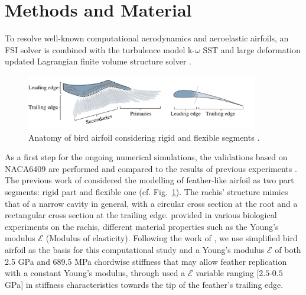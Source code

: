 \documentclass[conf]{new-aiaa}
\begin{document}
\section{Methods and Material}
To resolve well-known computational aerodynamics and aeroelastic airfoils, an FSI solver is combined with the turbulence model k-$\omega$ SST and large deformation updated Lagrangian finite volume structure solver \cite{cardiff2014large}.
%
%
\begin{figure}[ht!]
\centering
\includegraphics[width=0.9\textwidth]{figs/gamble-crop.pdf}
\caption{Anatomy of bird airfoil considering rigid and flexible segments \cite{gamble2020aeroelastic}.}
\label{fig:segments}
\end{figure}
%
As a first step for the ongoing numerical simulations, the validations based on NACA6409 are performed and compared to the results of previous experiments \cite{gamble2020aeroelastic}.
%
The previous work of \citet{gamble2020load} considered the modelling of feather-like airfoil as two part segments: rigid part and flexible one (cf. Fig.~\ref{fig:segments}).
The rachis' structure mimics that of a narrow cavity in general, with a circular cross section at the root and a rectangular cross section at the trailing edge.
%
\citet{bachmann2012flexural} provided in various biological experiments on the rachis, different material properties such as the Young's modulus $\mathcal{E}$ (Modulus of elasticity).
%
Following the work of \cite{gamble2020aeroelastic}, we use simplified bird airfoil as the basis for this computational study and a Young's modulus $\mathcal{E}$ of both 2.5 GPa and  689.5 MPa chordwise stiffness that may allow feather replication with a constant Young's modulus, through \cite{gamble2020load} used a $\mathcal{E}$ variable ranging [$2.5$-$0.5$ GPa] in stiffness characteristics towards the tip of the feather’s trailing edge.
\end{document}

